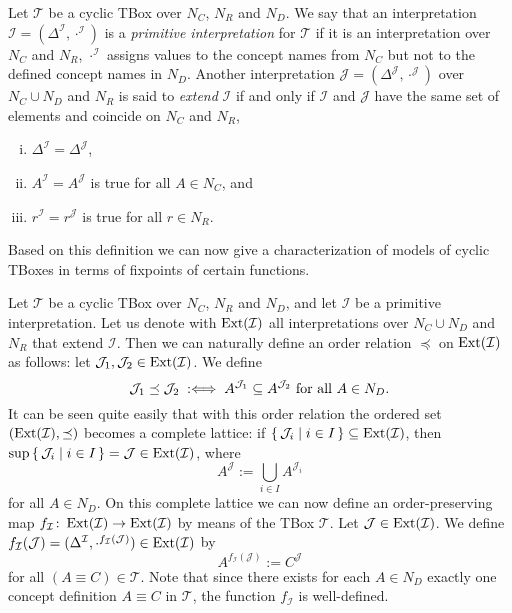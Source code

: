 \begin{Definition}
  \label{def:primite-interpretations-and-extentions}
  Let $\mathcal{T}$ be a cyclic TBox over $N_C$, $N_R$ and $N_D$.  We say that an
  interpretation $\mathcal{I} = (\Delta^{\mathcal{I}}, \cdot^{\mathcal{I}})$ is a
  \emph{primitive interpretation} for $\mathcal{T}$ if it is an interpretation over $N_C$
  and $N_R$, \ie $\cdot^{\mathcal{I}}$ assigns values to the concept names from $N_C$ but
  not to the defined concept names in $N_D$.  Another interpretation $\mathcal{J} =
  (\Delta^{\mathcal{J}}, \cdot^{\mathcal{J}})$ over $N_C \cup N_D$ and $N_R$ is said to
  \emph{extend} $\mathcal{I}$ if and only if $\mathcal{I}$ and $\mathcal{J}$ have the same
  set of elements and coincide on $N_C$ and $N_R$, \ie
  \begin{enumerate}[i. ]
  \item $\Delta^{\mathcal{I}} = \Delta^{\mathcal{J}}$,
  \item $A^{\mathcal{I}} = A^{\mathcal{J}}$ is true for all $A \in N_C$, and
  \item $r^{\mathcal{I}} = r^{\mathcal{J}}$ is true for all $r \in N_R$.
  \end{enumerate}
\end{Definition}

Based on this definition we can now give a characterization of models of cyclic TBoxes in
terms of fixpoints of certain functions.

Let $\mathcal{T}$ be a cyclic TBox over $N_C$, $N_R$ and $N_D$, and let $\mathcal{I}$ be a
primitive interpretation.  Let us denote with $\operatorname{Ext}(\mathcal{I})$ all interpretations over
$N_C \cup N_D$ and $N_R$ that extend $\mathcal{I}$.  Then we can naturally define an order
relation $\preceq$ on $\operatorname{Ext}(\mathcal{I})$ as follows: let $\mathcal{J}_1, \mathcal{J}_2
\in \operatorname{Ext}(\mathcal{I})$.  We define
\begin{equation*}
  \mathcal{J}_1 \preceq \mathcal{J}_2 \;:\Longleftrightarrow\; A^{\mathcal{J}_1} \subseteq A^{\mathcal{J}_2}
  \text{ for all } A \in N_D.
\end{equation*}
It can be seen quite easily that with this order relation the ordered set
$(\operatorname{Ext}(\mathcal{I}), \preceq)$ becomes a complete lattice: if ${\{\, \mathcal{J}_i \mid i
  \in I \,\}} \subseteq \operatorname{Ext}(\mathcal{I})$, then $\sup {\ensuremath{\{\, \mathcal{J}_i \mid i \in I \,\}}} =
\mathcal{J} \in \operatorname{Ext}(\mathcal{I})$, where
\begin{equation*}
  A^{\mathcal{J}} := \bigcup_{i \in I} A^{\mathcal{J}_i}
\end{equation*}
for all $A \in N_D$.  On this complete lattice we can now define an order-preserving map
$f_{\mathcal{I}} \colon \operatorname{Ext}(\mathcal{I}) \to \operatorname{Ext}(\mathcal{I})$ by means of the TBox
$\mathcal{T}$.  Let $\mathcal{J} \in \operatorname{Ext}(\mathcal{I})$.  We define
$f_{\mathcal{I}}(\mathcal{J}) = (\Delta^{\mathcal{I}},
\cdot^{f_{\mathcal{I}}(\mathcal{J})}) \in \operatorname{Ext}(\mathcal{I})$ by
\begin{equation*}
  A^{f_{\mathcal{I}}(\mathcal{J})} := C^{\mathcal{J}}
\end{equation*}
for all $(A \equiv C) \in \mathcal{T}$.  Note that since there exists for each $A \in N_D$
exactly one concept definition $A \equiv C$ in $\mathcal{T}$, the function
$f_{\mathcal{I}}$ is well-defined.

